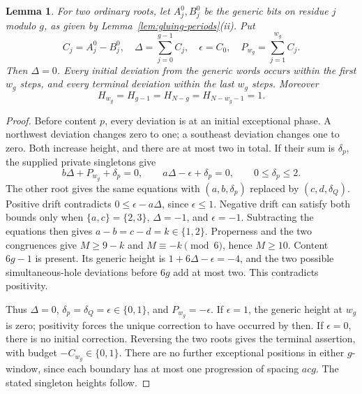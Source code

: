 \documentclass[11pt,a4paper]{amsart}
\numberwithin{equation}{section}
\theoremstyle{plain}
\newtheorem{lemma}[theorem]{Lemma}
\theoremstyle{definition}
\begin{document}
\begin{lemma}\label{lem:gluing-ordinary-drift}
For two ordinary roots, let \(A^0_j,B^0_j\) be the generic bits on residue \(j\) modulo \(g\), as given by Lemma~\ref{lem:gluing-periods}(ii).  Put
\begin{equation*}
 C_j=A^0_j-B^0_j,\quad \Delta=\sum_{j=0}^{g-1}C_j,
 \quad\epsilon=C_0,\quad P_{w_g}=\sum_{j=1}^{w_g}C_j.
\end{equation*}
Then \(\Delta=0\).  Every initial deviation from the generic words occurs within the first \(w_g\) steps, and every terminal deviation within the last \(w_g\) steps.  Moreover
\begin{equation}\label{eq:gluing-pinches}
 H_{w_g}=H_{g-1}=H_{N-g}=H_{N-w_g-1}=1.
\end{equation}
\end{lemma}
\begin{proof}
Before content \(p\), every deviation is at an initial exceptional phase.  A northwest deviation changes zero to one; a southeast deviation changes one to zero.  Both increase height, and there are at most two in total.  If their sum is \(\delta_p\), the supplied private singletons give
\begin{equation}\label{eq:gluing-pinch-equations}
 b\Delta+P_{w_g}+\delta_p=0,\qquad
 a\Delta-\epsilon+\delta_p=0,\qquad0\le\delta_p\le2.
\end{equation}
The other root gives the same equations with \((a,b,\delta_p)\) replaced by \((c,d,\delta_Q)\).  Positive drift contradicts \(0\le\epsilon-a\Delta\), since \(\epsilon\le1\).  Negative drift can satisfy both bounds only when
\(\{a,c\}=\{2,3\}\), \(\Delta=-1\), and \(\epsilon=-1\).
Subtracting the equations then gives \(a-b=c-d=k\in\{1,2\}\).  Properness and the two congruences give \(M\ge9-k\) and \(M\equiv-k\pmod6\), hence \(M\ge10\).  Content \(6g-1\) is present.  Its generic height is \(1+6\Delta-\epsilon=-4\), and the two possible simultaneous-hole deviations before \(6g\) add at most two.  This contradicts positivity.

Thus \(\Delta=0\), \(\delta_p=\delta_Q=\epsilon\in\{0,1\}\), and \(P_{w_g}=-\epsilon\).  If \(\epsilon=1\), the generic height at \(w_g\) is zero; positivity forces the unique correction to have occurred by then.  If \(\epsilon=0\), there is no initial correction.  Reversing the two roots gives the terminal assertion, with budget \(-C_{w_g}\in\{0,1\}\).  There are no further exceptional positions in either \(g\)-window, since each boundary has at most one progression of spacing \(acg\).  The stated singleton heights follow.
\end{proof}
\end{document}
